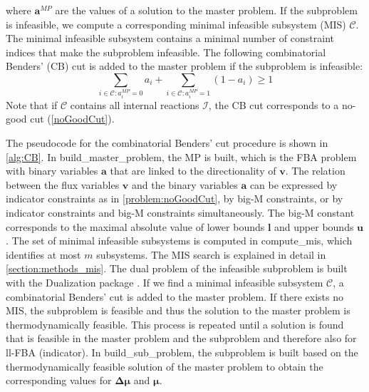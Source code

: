 where $\boldsymbol a^{MP}$ are the values of a solution to the master problem. If the subproblem is infeasible, we compute a corresponding minimal infeasible subsystem (MIS) $\mathcal{C}$. The minimal infeasible subsystem contains a minimal number of constraint indices that make the subproblem infeasible.
The following combinatorial Benders' (CB) cut is added to the master problem if the subproblem is infeasible:
\begin{equation*}
\sum_{i \in \mathcal{C}: a_i^{MP}=0} a_i + \sum_{i \in \mathcal{C}: a_i^{MP}=1} (1-a_i) \geq 1
\end{equation*}
Note that if $\mathcal{C}$ contains all internal reactions $\mathcal{I}$, the CB cut corresponds to a no-good cut (\cref{noGoodCut}).

The pseudocode for the combinatorial Benders' cut procedure is shown in \cref{alg:CB}. In \textsf{build\_master\_problem}, the MP is built, which is the FBA problem with binary variables $\boldsymbol a$ that are linked to the directionality of $\mathbf v$. The relation between the flux variables $\mathbf v$ and the binary variables $\boldsymbol a$ can be expressed by indicator constraints as in \cref{problem:noGoodCut}, by big-M constraints, or by indicator constraints and big-M constraints simultaneously. The big-M constant corresponds to the maximal absolute value of lower bounds $\mathbf l$ and upper bounds $\mathbf u$.
The set of minimal infeasible subsystems is computed in \textsf{compute\_mis}, which identifies at most $m$ subsystems. The MIS search is explained in detail in \cref{section:methods_mis}. The dual problem of the infeasible subproblem is built with the \textsf{Dualization} package \cite{dualization}.
If we find a minimal infeasible subsystem $\mathcal{C}$, a combinatorial Benders' cut is added to the master problem. If there exists no MIS, the subproblem is feasible and thus the solution to the master problem is thermodynamically feasible. 
This process is repeated until a solution is found that is feasible in the master problem and the subproblem and therefore also for \textsf{ll-FBA (indicator)}. In \textsf{build\_sub\_problem}, the subproblem is built based on the thermodynamically feasible solution of the master problem to obtain the corresponding values for $\boldsymbol{\Delta \mu}$ and $\boldsymbol \mu$. 

